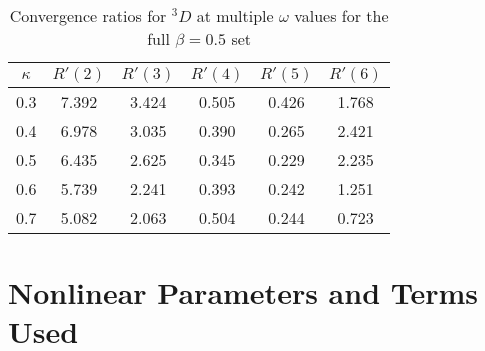 \documentclass[Dissertation.tex]{subfiles}
\begin{document}
\begin{table}
\centering
\begin{tabular}{cccccc}
\toprule
$\kappa$ & $R'(2)$ & $R'(3)$ & $R'(4)$ & $R'(5)$ & $R'(6)$ \\
\midrule
0.3 & 7.392 & 3.424 & 0.505 & 0.426 & 1.768 \\
0.4 & 6.978 & 3.035 & 0.390 & 0.265 & 2.421 \\
0.5 & 6.435 & 2.625 & 0.345 & 0.229 & 2.235 \\
0.6 & 5.739 & 2.241 & 0.393 & 0.242 & 1.251 \\
0.7 & 5.082 & 2.063 & 0.504 & 0.244 & 0.723 \\
\bottomrule
\end{tabular}
\caption{Convergence ratios for $^3D$ at multiple $\omega$ values for the full $\beta = 0.5$ set}
\label{tab:D3Beta5VarConv}
\end{table}


\section{Nonlinear Parameters and Terms Used}
\label{sec:NonlinParam}
\end{document}
